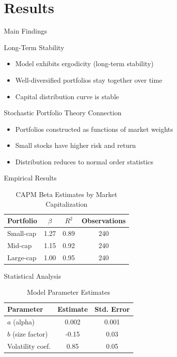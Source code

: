 \documentclass{beamer}
\begin{document}
\section{Results}

\begin{frame}{Main Findings}
\begin{block}{Long-Term Stability}
\begin{itemize}
    \item Model exhibits ergodicity (long-term stability)
    \item Well-diversified portfolios stay together over time
    \item Capital distribution curve is stable
\end{itemize}
\end{block}

\begin{block}{Stochastic Portfolio Theory Connection}
\begin{itemize}
    \item Portfolios constructed as functions of market weights
    \item Small stocks have higher risk and return
    \item Distribution reduces to normal order statistics
\end{itemize}
\end{block}
\end{frame}

\begin{frame}{Empirical Results}
\small
\begin{table}
\centering
\begin{tabular}{lccc}
\hline
Portfolio & $\beta$ & $R^2$ & Observations \\
\hline
Small-cap & 1.27 & 0.89 & 240 \\
Mid-cap & 1.15 & 0.92 & 240 \\
Large-cap & 1.00 & 0.95 & 240 \\
\hline
\end{tabular}
\caption{CAPM Beta Estimates by Market Capitalization}
\end{table}
\end{frame}

\begin{frame}{Statistical Analysis}
\small
\begin{table}
\centering
\begin{tabular}{lcc}
\hline
Parameter & Estimate & Std. Error \\
\hline
$a$ (alpha) & 0.002 & 0.001 \\
$b$ (size factor) & -0.15 & 0.03 \\
Volatility coef. & 0.85 & 0.05 \\
\hline
\end{tabular}
\caption{Model Parameter Estimates}
\end{table}
\end{frame}
\end{document}
